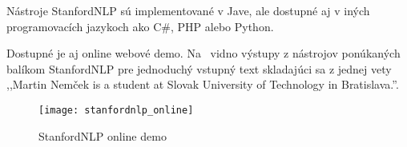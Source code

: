 Nástroje StanfordNLP sú implementované v Jave, ale dostupné aj v iných programovacích jazykoch ako C\#, PHP alebo Python.

Dostupné je aj online webové demo. Na~ vidno výstupy z nástrojov ponúkaných balíkom StanfordNLP pre jednoduchý vstupný text skladajúci sa z jednej vety ,,Martin Nemček is a student at Slovak University of Technology in Bratislava.''.

\begin{figure}[H]
\begin{center}\texttt{[image: stanfordnlp\_online]}\end{center}
\caption[StanfordNLP online demo]{StanfordNLP online demo}\label{fig:stanfordnlp_online_demo}
\end{figure}

%
%
%

